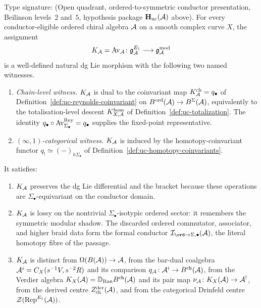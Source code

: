 \begin{theorem}
\label{thm:uc-universal-conductor}
\ClaimStatusProvedHere
Type signature: \textup{(}Open quadrant, ordered-to-symmetric
conductor presentation, Beilinson levels~$2$ and~$5$, hypothesis
package $\mathbf H_{\mathrm{uc}}(\mathcal{A})$ above\textup{)}.
For every conductor-eligible ordered chiral algebra $\mathcal{A}$ on a smooth
complex curve $X$,
the assignment
\[
 K_{\mathcal{A}}=\operatorname{Av}_{\mathcal{A}}\colon \mathfrak{g}_{\mathcal{A}}^{E_1}\longrightarrow \mathfrak{g}_{\mathcal{A}}^{\mathrm{mod}}
\]
is a well-defined natural dg Lie morphism with the following two named
witnesses.
\begin{enumerate}
\item[\textup{(i)}] \emph{Chain-level witness.}
 $K_{\mathcal{A}}$ is dual to the coinvariant map
 $K_{\mathcal{A}}^{\mathrm{ch}}=q_\bullet$ of
 Definition~\ref{def:uc-reynolds-coinvariant} on
 $B^{\mathrm{ord}}(\mathcal{A})\to B^{\Sigma}(\mathcal{A})$, equivalently to the
 totalisation-level descent
 $K_{X,\mathcal{A}}^{\mathrm{hom}}$ of
 Definition~\ref{def:uc-totalization}.  The identity
 $q_\bullet\circ\operatorname{Av}^{\mathrm{Rey}}_{\Sigma_\bullet}=q_\bullet$
 supplies the fixed-point representative.
\item[\textup{(ii)}] \emph{$(\infty,1)$-categorical witness.}
 $K_{\mathcal{A}}$ is induced by the homotopy-coinvariant functor
 $q_!\simeq(-)_{h\Sigma_\bullet}$ of
 Definition~\ref{def:uc-homotopy-coinvariants}.
\end{enumerate}
It satisfies:
\begin{enumerate}
\item[\textup{(a)}] $K_{\mathcal{A}}$ preserves the dg Lie differential and the
 bracket because these operations are $\Sigma_\bullet$-equivariant on
 the conductor domain.
\item[\textup{(b)}] $K_{\mathcal{A}}$ is lossy on the nontrivial
 $\Sigma_\bullet$-isotypic ordered sector: it remembers the symmetric
 modular shadow. The discarded ordered commutator, associator, and
 higher braid data form the formal conductor
 $\mathcal I_{\ord\to\Sigma,\bullet}(\cA)$, the literal homotopy fibre
 of the passage.
\item[\textup{(c)}] $K_{\mathcal{A}}$ is distinct from
 $\Omega(B(\mathcal{A}))\to \mathcal{A}$, from the bar-dual coalgebra
 $\mathcal{A}^i=C_X(s^{-1}V,s^{-2}R)$ and its comparison
 $q_{\mathcal{A}}\colon\mathcal{A}^i\to B^{\mathrm{ch}}(\mathcal{A})$, from the Verdier algebra
 $K_X(\mathcal{A})=\mathbb D_{\operatorname{Ran}}B^{\mathrm{ch}}(\mathcal{A})$ and its pair map
 $\nu_{\mathcal{A}}\colon K_X(\mathcal{A})\to\mathcal{A}^!$, from the derived centre
 $Z^{\mathrm{der}}_{\mathrm{ch}}(\mathcal{A})$, and from the categorical Drinfeld centre
 $\mathcal Z(\operatorname{Rep}^{E_1}(\mathcal{A}))$.
\end{enumerate}
\end{theorem}

